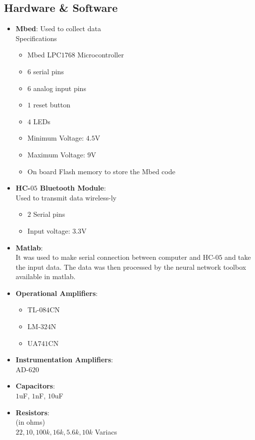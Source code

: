 \documentclass{article}
\begin{document}
\subsection{Hardware \& Software}
\begin{itemize}
\item \textbf{Mbed}: Used to collect data 
\\Specifications
\begin{itemize}
\item Mbed LPC$1768$ Microcontroller
\item $6$ serial pins
\item $6$ analog input pins
\item $1$ reset button
\item $4$ LEDs
\item Minimum Voltage: $4.5$V
\item Maximum Voltage: $9$V
\item On board Flash memory to store the Mbed code
\end{itemize}
\item \textbf{HC-$05$ Bluetooth Module}:\\Used to transmit data wireless-ly
\begin{itemize}
\item $2$ Serial pins
\item Input voltage: $3.3$V
\end{itemize}

\item \textbf{Matlab}:
\\
It was used to make serial connection between computer and HC-$05$ and take the input data. The data was then processed by the neural network toolbox available in matlab.

\item \textbf{Operational Amplifiers}: 
\begin{itemize}
\item TL-$084$CN
\item LM-$324$N
\item UA$741$CN
\end{itemize}

\item \textbf{Instrumentation Amplifiers}:
\\
AD-$620$  

\item \textbf{Capacitors}: 
\\
$1$uF, $1$nF, $10$uF 

\item \textbf{Resistors}:
\\
(in ohms)
\\
$22, 10, 100k, 16k, 5.6k, 10k$ Variacs 
\end{itemize}
\end{document}
